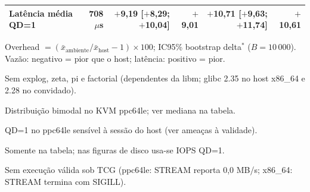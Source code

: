 \begin{table}[htbp]
\begin{threeparttable}
\begin{tabular}{lrrrrr}
Latência média QD=1\tnote{d} & 708 $\mu$s & $+$9,19 [$+$8,29; $+$10,04] & $+$9,01 & $+$10,71 [$+$9,63; $+$11,74] & $+$10,61 \\
\bottomrule
\end{tabular}
\begin{tablenotes}\footnotesize
\item Overhead $= (\bar{x}_{\text{ambiente}} / \bar{x}_{\text{host}} - 1) \times 100$; IC95\% bootstrap delta$^*$ ($B = 10\,000$). Vazão: negativo = pior que o host; latência: positivo = pior.
\item[a] Sem explog, zeta, pi e factorial (dependentes da libm; glibc 2.35 no host x86\_64 e 2.28 no convidado).
\item[b] Distribuição bimodal no KVM ppc64le; ver mediana na tabela.
\item[c] QD=1 no ppc64le sensível à sessão do host (ver ameaças à validade).
\item[d] Somente na tabela; nas figuras de disco usa-se IOPS QD=1.
\item[e] Sem execução válida sob TCG (ppc64le: STREAM reporta 0,0 MB/s; x86\_64: STREAM termina com SIGILL).
\end{tablenotes}
\end{threeparttable}
\end{table}
